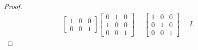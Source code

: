 \documentclass{article}
\begin{document}
\begin{flushleft}
\begin{proof}
\begin{align*}
\begin{bmatrix}
					1 & 0 & 0 \\
					0 & 0 & 1
				\end{bmatrix}
				\begin{bmatrix}
					0 & 1 & 0 \\
					1 & 0 & 0 \\
					0 & 0 & 1
				\end{bmatrix}
				= \begin{bmatrix}
					1 & 0 & 0 \\
					0 & 1 & 0 \\
					0 & 0 & 1
				\end{bmatrix}
				= I.
			\end{align*}
		
		\end{proof}
	
	\end{flushleft}
	
\end{document}
